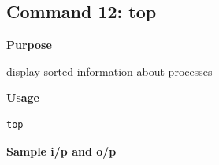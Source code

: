 \subsection{Command 12: top} 
\textbf{Purpose}
\begin{flushleft}
 display sorted information about processes
\end{flushleft}
\textbf{Usage}
\begin{verbatim}
top
\end{verbatim}
\textbf{Sample i/p and o/p}
\begin{figure}[H] 
\end{figure}

